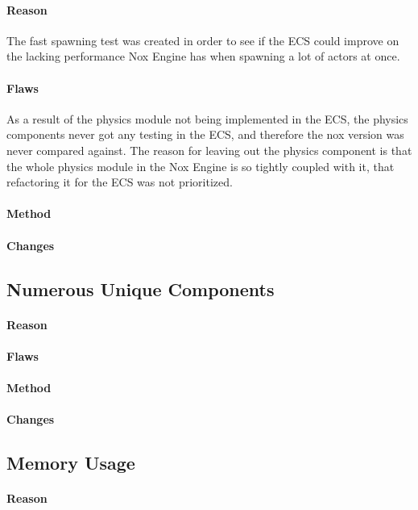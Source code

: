 \paragraph{Reason}
The fast spawning test was created in order to see if the ECS could improve on the lacking performance Nox Engine has when spawning a lot of actors at once.

\paragraph{Flaws}
As a result of the physics module not being implemented in the ECS, the physics components never got any testing in the ECS, and therefore the nox version was never compared against.
The reason for leaving out the physics component is that the whole physics module in the Nox Engine is so tightly coupled with it, that refactoring it for the ECS was not prioritized.

\paragraph{Method}
\paragraph{Changes}

\subsection{Numerous Unique Components}
\paragraph{Reason}
\paragraph{Flaws}
\paragraph{Method}
\paragraph{Changes}

\subsection{Memory Usage}
\paragraph{Reason}
